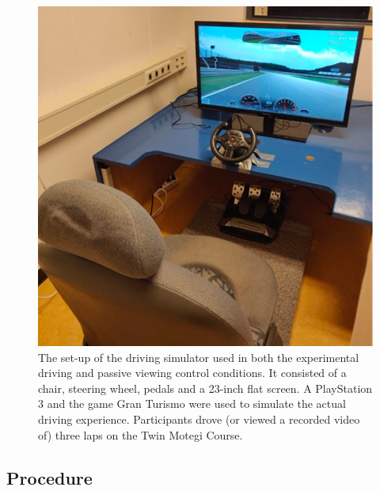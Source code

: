 \documentclass[authordate, empirical]{jote-new-article}
\begin{document}
\begin{figure}[t]

  \begin{fullwidth}

    \includegraphics[width=\textwidth]{media/image1.png}
    \caption{The set-up of the driving simulator used in both the experimental driving and passive viewing control conditions. It consisted of a chair, steering wheel, pedals and a 23-inch flat screen. A PlayStation 3 and the game Gran Turismo \parencites{Yamauchi2013} were used to simulate the actual driving experience. Participants drove (or viewed a recorded video of) three laps on the Twin Motegi Course.}
    \label{fig:rId12}
  \end{fullwidth}
\end{figure}


\subsection{Procedure}
\end{document}
